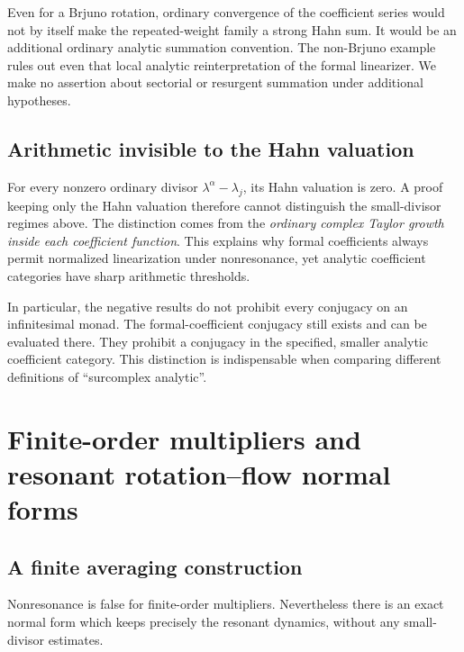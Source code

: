 \documentclass[11pt,letterpaper]{article}
\theoremstyle{definition}
\theoremstyle{remark}
\numberwithin{equation}{section}
\begin{document}
Even for a Brjuno rotation, ordinary convergence of the coefficient series
would not by itself make the repeated-weight family a strong Hahn sum.
It would be an additional ordinary analytic summation convention. The
non-Brjuno example rules out even that local analytic reinterpretation of
the formal linearizer. We make no assertion about sectorial or resurgent
summation under additional hypotheses.

\subsection{Arithmetic invisible to the Hahn valuation}
For every nonzero ordinary divisor $\lambda^\alpha-\lambda_j$, its Hahn
valuation is zero. A proof keeping only the Hahn valuation therefore cannot
distinguish the small-divisor regimes above. The distinction comes from the
\emph{ordinary complex Taylor growth inside each coefficient function}.
This explains why formal coefficients always permit normalized
linearization under nonresonance, yet analytic coefficient categories have
sharp arithmetic thresholds.

In particular, the negative results do not prohibit every conjugacy on an
infinitesimal monad. The formal-coefficient conjugacy still exists and can be
evaluated there. They prohibit a conjugacy in the specified, smaller
analytic coefficient category. This distinction is indispensable when
comparing different definitions of ``surcomplex analytic''.

\section{Finite-order multipliers and resonant rotation--flow normal forms}
\label{sec:finite-order}

\subsection{A finite averaging construction}
Nonresonance is false for finite-order multipliers. Nevertheless there is an
exact normal form which keeps precisely the resonant dynamics, without any
small-divisor estimates.
\end{document}
